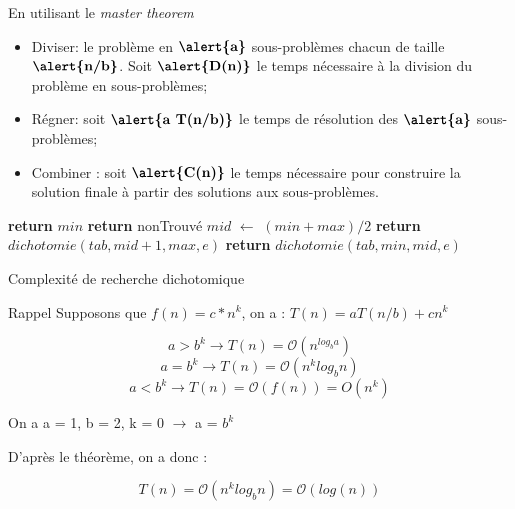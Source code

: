 \documentclass[10pt,xcolor=dvipsnames]{beamer}
\newcommand*\Let[2]{\State #1 $\gets$ #2}
\begin{document}
\begin{frame}{En utilisant le \textit{master theorem}}
\begin{minipage}{.39\linewidth}
  \begin{itemize}
    \item \alert{Diviser}: le problème en $\textbf{\alert{a}}$ sous-problèmes chacun de taille $\textbf{\alert{n/b}}$. Soit $\textbf{\alert{D(n)}}$ le temps nécessaire à la division du problème en sous-problèmes;
    \item \alert{Régner}: soit $\textbf{\alert{a T(n/b)}}$ le temps de résolution des $\textbf{\alert{a}}$ sous-problèmes;
    \item \alert{Combiner} : soit $\textbf{\alert{C(n)}}$ le temps nécessaire pour construire la solution finale à partir des solutions aux sous-problèmes.
\end{itemize}
\end{minipage}
\begin{minipage}{.59\linewidth}
  \begin{algorithmic}[1]
        
                \State \textbf{return} $min$
            \EndIf
        \Else
            \State \textbf{return} nonTrouvé
        \EndIf
    \Let{$mid$}{$( min + max ) / 2$}
        \State \textbf{return} $dichotomie(tab, mid+1, max, e)$
    \Else
        \State \textbf{return} $dichotomie(tab, min, mid, e)$
    \EndIf
    \EndFunction
  \end{algorithmic}
\end{minipage}

\end{frame}

\begin{frame}{Complexité de recherche dichotomique}
    \begin{alertblock}{Rappel}
    Supposons que $f(n) = c*n^k$, on a : $T(n) = a T(n/b) + c n^k$

\begin{equation*}
    a > b^k \rightarrow T(n) = \mathcal{O}(n^{log_b a})
\end{equation*}
\begin{equation*}
    a = b^k \rightarrow T(n) = \mathcal{O}(n^k log_b n)
\end{equation*}
\begin{equation*}
    a < b^k \rightarrow T(n) = \mathcal{O}( f(n) ) = O(n^k)
\end{equation*}
    \end{alertblock}

On a \alert{a = 1, b = 2, k = 0} $\rightarrow$ a = $b^k$

D'après le théorème, on a donc :

\begin{equation*}
    T(n) = \mathcal{O}(n^k log_b n) = \mathcal{O}(log(n))
\end{equation*}
% 
\end{frame}    
\end{document}
